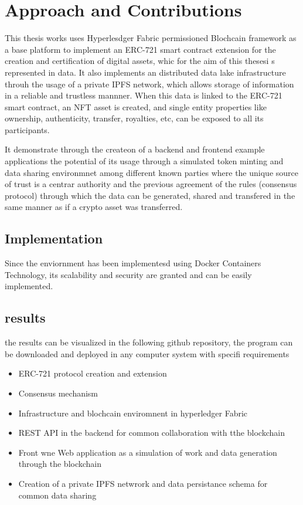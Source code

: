 \section{Approach and Contributions}

This thesis works uses Hyperlesdger Fabric permissioned Blochcain framework as a base platform to implement an ERC-721 smart contract extension for the creation and certification of digital assets, whic for the aim of this thesesi s represented in data. 
It also implements an distributed data lake infrastructure throuh the usage of a private IPFS network, which allows storage of information in a reliable and trustless mannner. When this data is linked to the ERC-721 smart contract, an NFT asset is created, and single entity properties like ownership, authenticity, transfer, royalties, etc, can be exposed to all its participants.

It demonstrate through the createon of a backend and frontend example applications the potential of its usage through a simulated token minting and data sharing environmnet among different known parties where the unique source of trust is a centrar authority and the previous agreement of the rules (consensus protocol) through which the data can be generated, shared and transfered in the same manner as if a crypto asset was transferred.
\subsection{Implementation}
Since the enviornment has been implementesd using Docker Containers Technology, its scalability and security are granted and can be easily implemented.

\subsection{results}

the results can be visualized in  the following github repository, the program can be downloaded and deployed in any computer system with specifi requirements
\begin{itemize}
    \item ERC-721 protocol creation and extension
    \item Consensus mechanism
    \item Infrastructure and blochcain enviromnent in hyperledger Fabric
    \item REST API in the backend for common collaboration with tthe blockchain
    \item Front wne Web application as a simulation of  work and data generation through the blockchain
    \item Creation of a private IPFS netwrork and data persistance schema for common data sharing
\end{itemize}

